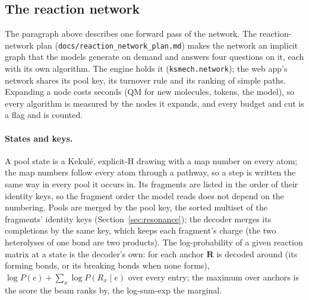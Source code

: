 \documentclass[11pt,a4paper]{article}
\newcommand{\vb}[1]{\bm{#1}}
\begin{document}
\subsection{The reaction network}
\label{sec:network}

The paragraph above describes one forward pass of the network. The reaction-network plan (\texttt{docs/reaction\_network\_plan.md}) makes the network an implicit graph that the models generate on demand and answers four questions on it, each with its own algorithm. The engine holds it (\texttt{ksmech.network}); the web app's network shares its pool key, its turnover rule and its ranking of simple paths. Expanding a node costs seconds (QM for new molecules, tokens, the model), so every algorithm is measured by the nodes it expands, and every budget and cut is a flag and is counted.

\paragraph{States and keys.} A pool state is a Kekul\'e, explicit-H drawing with a map number on every atom; the map numbers follow every atom through a pathway, so a step is written the same way in every pool it occurs in. Its fragments are listed in the order of their identity keys, so the fragment order the model reads does not depend on the numbering. Pools are merged by the pool key, the sorted multiset of the fragments' identity keys (Section~\ref{sec:resonance}); the decoder merges its completions by the same key, which keeps each fragment's charge (the two heterolyses of one bond are two products). The log-probability of a given reaction matrix at a state is the decoder's own: for each anchor $\vb R$ is decoded around (its forming bonds, or its breaking bonds when none forms), $\log P(e)+\sum_x \log P(R_x\mid e)$ over every entry; the maximum over anchors is the score the beam ranks by, the log-sum-exp the marginal.
\end{document}
